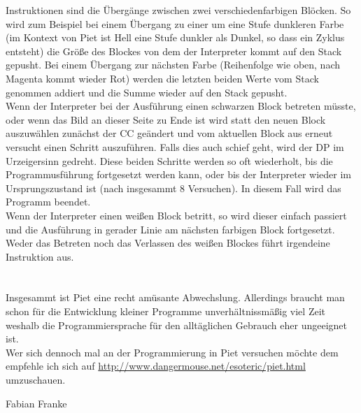 {Instruktionen sind die Übergänge zwischen zwei verschiedenfarbigen Blöcken.
  So wird zum Beispiel bei einem Übergang zu einer um eine Stufe dunkleren
  Farbe (im Kontext von Piet ist \glqq{}Hell\grqq{} eine Stufe dunkler als \glqq{}Dunkel\grqq{}, so dass
  ein Zyklus entsteht) die Größe des Blockes von dem der Interpreter kommt auf den
  Stack gepusht.
  Bei einem Übergang zur nächsten Farbe (Reihenfolge wie oben, nach Magenta
  kommt wieder Rot) werden die letzten beiden Werte vom Stack genommen addiert
  und die Summe wieder auf den Stack gepusht.\vspace{5em}\\

Wenn der Interpreter bei der Ausführung einen schwarzen Block betreten
  müsste, oder wenn das Bild an dieser Seite zu Ende ist wird statt den neuen
  Block auszuwählen zunächst der CC geändert und vom aktuellen Block aus erneut
  versucht einen Schritt auszuführen. Falls dies auch schief geht, wird der DP
  im Urzeigersinn gedreht. Diese beiden Schritte werden so oft wiederholt, bis
  die Programmusführung fortgesetzt werden kann, oder bis der Interpreter
  wieder im Ursprungszustand ist (nach insgesammt 8 Versuchen). In diesem Fall
  wird das Programm beendet.\\

Wenn der Interpreter einen weißen Block betritt, so wird dieser einfach
  passiert und die Ausführung in gerader Linie am nächsten farbigen Block
  fortgesetzt. Weder das Betreten noch das Verlassen des weißen Blockes führt
  irgendeine Instruktion aus.\\

~\\~\\
Insgesammt ist Piet eine recht amüsante Abwechslung. Allerdings braucht man
schon für die Entwicklung kleiner Programme unverhältnissmäßig viel Zeit
weshalb die Programmiersprache für den alltäglichen Gebrauch eher ungeeignet
ist.\\
Wer sich dennoch mal an der Programmierung in Piet versuchen möchte dem
empfehle ich sich auf \url{http://www.dangermouse.net/esoteric/piet.html}
umzuschauen.

}
{Fabian Franke}
